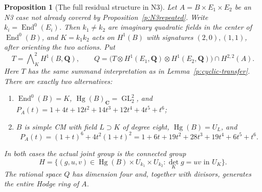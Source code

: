 \documentclass[10pt,reqno]{article}
\theoremstyle{emphasizedplain}
\newtheorem{proposition}[theorem]{Proposition}
\theoremstyle{emphasizeddefinition}
\theoremstyle{emphasizeddefinition}
\DeclareMathOperator{\End}{End}
\DeclareMathOperator{\Hg}{Hg}
\DeclareMathOperator{\GL}{GL}
\newcommand{\Q}{\mathbf Q}
\newcommand{\C}{\mathbf C}
\begin{document}
\begin{proposition}[The full residual structure in N3]\label{p:N3residual}
Let $A=B\times E_1\times E_2$ be an N3 case not already covered
by Proposition~\ref{p:N3repeated}. Write $k_i=\End^0(E_i)$.
Then $k_1\ne k_2$ are imaginary quadratic fields in the center
of $\End^0(B)$, and $K=k_1k_2$ acts on $H^1(B)$ with signatures
$(2,0),(1,1)$, after orienting the two actions. Put
\[
 T=\bigwedge\nolimits_K^2 H^1(B,\Q),\qquad
 Q=\bigl(T\otimes H^1(E_1,\Q)\otimes H^1(E_2,\Q)\bigr)
       \cap H^{2,2}(A).
\]
Here $T$ has the same summand interpretation as in
Lemma~\ref{p:cyclic-transfer}. There are exactly two alternatives:
\begin{enumerate}
\item $\End^0(B)=K$, $\Hg(B)_\C=\GL_2^2$, and
$P_A(t)=1+4t+12t^2+14t^3+12t^4+4t^5+t^6$;
\item $B$ is simple CM with field $L\supset K$ of degree eight,
$\Hg(B)=U_L$, and
\[
 P_A(t)=(1+t)^6+4t^2(1+t)^2
 =1+6t+19t^2+28t^3+19t^4+6t^5+t^6.
\]
\end{enumerate}
In both cases the actual joint group is the connected group
\[
 H=\{(g,u,v)\in\Hg(B)\times U_{k_1}\times U_{k_2}:
                         \det_K g=uv\text{ in }U_K\}.
\]
The rational space $Q$ has dimension four and, together with
divisors, generates the entire Hodge ring of $A$.
\end{proposition}
\end{document}
